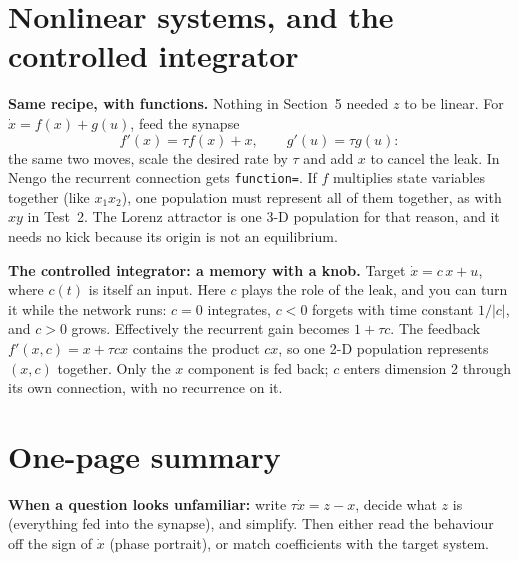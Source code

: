 \documentclass[11pt,letterpaper]{article}
\begin{document}
\section{Nonlinear systems, and the controlled integrator}

\textbf{Same recipe, with functions.} Nothing in Section~5 needed $z$ to be linear. For $\dot x = f(x) + g(u)$, feed the synapse
\[
f'(x) = \tau f(x) + x, \qquad g'(u) = \tau g(u):
\]
the same two moves, scale the desired rate by $\tau$ and add $x$ to cancel the leak. In Nengo the recurrent connection gets \texttt{function=}. If $f$ multiplies state variables together (like $x_1x_2$), one population must represent all of them together, as with $xy$ in Test~2. The Lorenz attractor is one 3-D population for that reason, and it needs no kick because its origin is not an equilibrium.

\textbf{The controlled integrator: a memory with a knob.} Target $\dot x = c\,x + u$, where $c(t)$ is itself an input. Here $c$ plays the role of the leak, and you can turn it while the network runs: $c = 0$ integrates, $c < 0$ forgets with time constant $1/|c|$, and $c > 0$ grows. Effectively the recurrent gain becomes $1 + \tau c$. The feedback $f'(x, c) = x + \tau c x$ contains the product $cx$, so one 2-D population represents $(x, c)$ together. Only the $x$ component is fed back; $c$ enters dimension 2 through its own connection, with no recurrence on it.

\newpage
\section{One-page summary}

\begin{key}
\textbf{When a question looks unfamiliar:} write $\tau\dot x = z - x$, decide what $z$ is (everything fed into the synapse), and simplify. Then either read the behaviour off the sign of $\dot x$ (phase portrait), or match coefficients with the target system.
\end{key}
\end{document}
